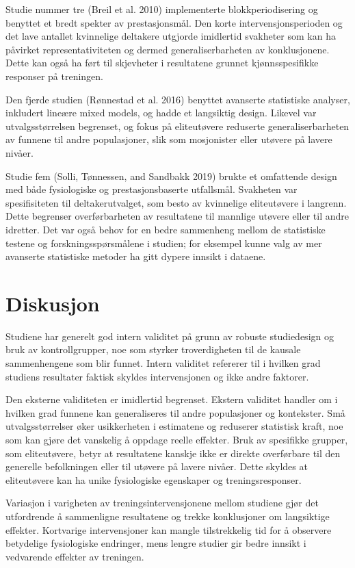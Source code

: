 \documentclass[
  letterpaper,
  DIV=11,
  numbers=noendperiod]{scrreprt}
\begin{document}
Studie nummer tre (Breil et al. 2010) implementerte blokkperiodisering
og benyttet et bredt spekter av prestasjonsmål. Den korte
intervensjonsperioden og det lave antallet kvinnelige deltakere utgjorde
imidlertid svakheter som kan ha påvirket representativiteten og dermed
generaliserbarheten av konklusjonene. Dette kan også ha ført til
skjevheter i resultatene grunnet kjønnsspesifikke responser på
treningen.

Den fjerde studien (Rønnestad et al. 2016) benyttet avanserte
statistiske analyser, inkludert lineære mixed models, og hadde et
langsiktig design. Likevel var utvalgsstørrelsen begrenset, og fokus på
eliteutøvere reduserte generaliserbarheten av funnene til andre
populasjoner, slik som mosjonister eller utøvere på lavere nivåer.

Studie fem (Solli, Tønnessen, and Sandbakk 2019) brukte et omfattende
design med både fysiologiske og prestasjonsbaserte utfallsmål. Svakheten
var spesifisiteten til deltakerutvalget, som besto av kvinnelige
eliteutøvere i langrenn. Dette begrenser overførbarheten av resultatene
til mannlige utøvere eller til andre idretter. Det var også behov for en
bedre sammenheng mellom de statistiske testene og forskningsspørsmålene
i studien; for eksempel kunne valg av mer avanserte statistiske metoder
ha gitt dypere innsikt i dataene.

\section{Diskusjon}\label{diskusjon-4}

Studiene har generelt god intern validitet på grunn av robuste
studiedesign og bruk av kontrollgrupper, noe som styrker troverdigheten
til de kausale sammenhengene som blir funnet. Intern validitet refererer
til i hvilken grad studiens resultater faktisk skyldes intervensjonen og
ikke andre faktorer.

Den eksterne validiteten er imidlertid begrenset. Ekstern validitet
handler om i hvilken grad funnene kan generaliseres til andre
populasjoner og kontekster. Små utvalgsstørrelser øker usikkerheten i
estimatene og reduserer statistisk kraft, noe som kan gjøre det
vanskelig å oppdage reelle effekter. Bruk av spesifikke grupper, som
eliteutøvere, betyr at resultatene kanskje ikke er direkte overførbare
til den generelle befolkningen eller til utøvere på lavere nivåer. Dette
skyldes at eliteutøvere kan ha unike fysiologiske egenskaper og
treningsresponser.

Variasjon i varigheten av treningsintervensjonene mellom studiene gjør
det utfordrende å sammenligne resultatene og trekke konklusjoner om
langsiktige effekter. Kortvarige intervensjoner kan mangle tilstrekkelig
tid for å observere betydelige fysiologiske endringer, mens lengre
studier gir bedre innsikt i vedvarende effekter av treningen.
\end{document}
